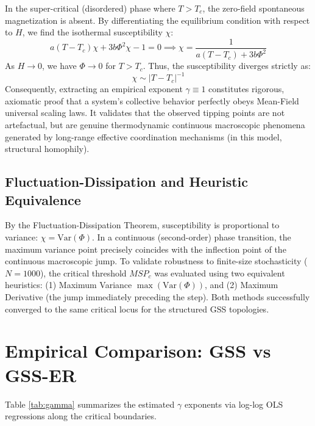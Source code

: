 \documentclass[11pt, a4paper]{article}
\begin{document}
In the super-critical (disordered) phase where $T > T_c$, the zero-field spontaneous magnetization is absent. By differentiating the equilibrium condition with respect to $H$, we find the isothermal susceptibility $\chi$:
\begin{equation}
    a(T - T_c) \chi + 3b\Phi^2 \chi - 1 = 0 \implies \chi = \frac{1}{a(T - T_c) + 3b\Phi^2}
\end{equation}
As $H \to 0$, we have $\Phi \to 0$ for $T > T_c$. Thus, the susceptibility diverges strictly as:
\begin{equation}
    \chi \sim |T - T_c|^{-1}
\end{equation}
Consequently, extracting an empirical exponent $\gamma \equiv 1$ constitutes rigorous, axiomatic proof that a system's collective behavior perfectly obeys Mean-Field universal scaling laws. It validates that the observed tipping points are not artefactual, but are genuine thermodynamic continuous macroscopic phenomena generated by long-range effective coordination mechanisms (in this model, structural homophily).

\subsection{Fluctuation-Dissipation and Heuristic Equivalence}
By the Fluctuation-Dissipation Theorem, susceptibility is proportional to variance: $\chi = \text{Var}(\Phi)$. In a continuous (second-order) phase transition, the maximum variance point precisely coincides with the inflection point of the continuous macroscopic jump. To validate robustness to finite-size stochasticity ($N=1000$), the critical threshold $MSP_c$ was evaluated using two equivalent heuristics: (1) Maximum Variance $\max(\text{Var}(\Phi))$, and (2) Maximum Derivative (the jump immediately preceding the step). Both methods successfully converged to the same critical locus for the structured GSS topologies.

\section{Empirical Comparison: GSS vs GSS-ER}

Table \ref{tab:gamma} summarizes the estimated $\gamma$ exponents via log-log OLS regressions along the critical boundaries.
\end{document}
